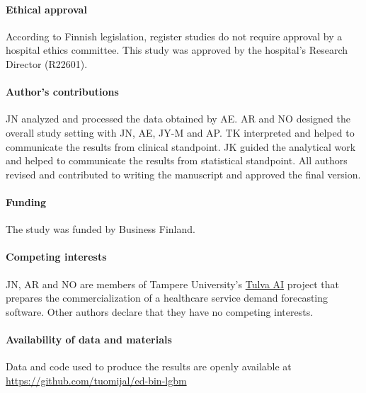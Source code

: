 \paragraph{Ethical approval} According to Finnish legislation, register studies do not require approval by a hospital ethics committee. This study was approved by the hospital’s Research Director (R22601).

\paragraph{Author's contributions} JN analyzed and processed the data obtained by AE. AR and NO designed the overall study setting with JN, AE, JY-M and AP. TK interpreted and helped to communicate the results from clinical standpoint. JK guided the analytical work and helped to communicate the results from statistical standpoint. All authors revised and contributed to writing the manuscript and approved the final version.

\paragraph{Funding} The study was funded by Business Finland.

\paragraph{Competing interests} JN, AR and NO are members of Tampere University's \href{www.tulva.ai}{Tulva AI} project that prepares the commercialization of a healthcare service demand forecasting software. Other authors declare that they have no competing interests.

\paragraph{Availability of data and materials} Data and code used to produce the results are openly available at \url{https://github.com/tuomijal/ed-bin-lgbm}